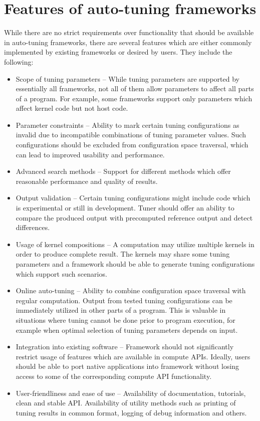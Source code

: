 \documentclass
[
    digital, %
    oneside, %
    table, %
    nolof, %
    nolot, %
    nocover %
]{fithesis3}
\begin{document}
\section{Features of auto-tuning frameworks}
While there are no strict requirements over functionality that should be available in auto-tuning frameworks, there are several features which are either
commonly implemented by existing frameworks or desired by users. They include the following: 
\begin{itemize}
    \item Scope of tuning parameters -- While tuning parameters are supported by essentially all frameworks, not all of them allow parameters to affect
    all parts of a program. For example, some frameworks support only parameters which affect kernel code but not host code.
    \item Parameter constraints -- Ability to mark certain tuning configurations as invalid due to incompatible combinations of tuning parameter values.
    Such configurations should be excluded from configuration space traversal, which can lead to improved usability and performance.
    \item Advanced search methods -- Support for different methods which offer reasonable performance and quality of results.
    \item Output validation -- Certain tuning configurations might include code which is experimental or still in development. Tuner should offer
    an ability to compare the produced output with precomputed reference output and detect differences.
    \item Usage of kernel compositions -- A computation may utilize multiple kernels in order to produce complete result. The kernels may share some
    tuning parameters and a framework should be able to generate tuning configurations which support such scenarios.
    \item Online auto-tuning -- Ability to combine configuration space traversal with regular computation. Output from tested tuning configurations can
    be immediately utilized in other parts of a program. This is valuable in situations where tuning cannot be done prior to program execution, for
    example when optimal selection of tuning parameters depends on input.
    \item Integration into existing software -- Framework should not significantly restrict usage of features which are available in compute APIs.
    Ideally, users should be able to port native applications into framework without losing access to some of the corresponding compute API functionality.
    \item User-friendliness and ease of use -- Availability of documentation, tutorials, clean and stable API. Availability of utility methods such
    as printing of tuning results in common format, logging of debug information and others.
\end{itemize}
\end{document}
